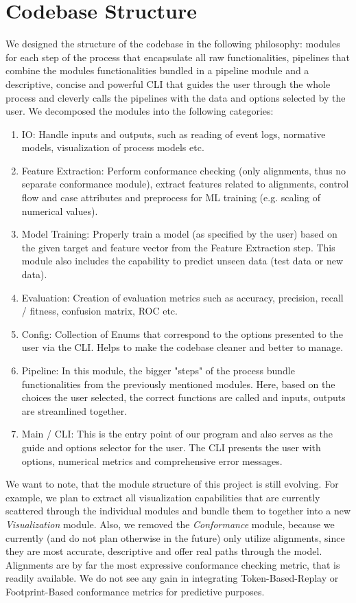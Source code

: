 \documentclass[12pt,a4paper]{article}
\begin{document}
\section{Codebase Structure}
We designed the structure of the codebase in the following philosophy: modules for each step of the process that encapsulate all raw functionalities, pipelines that combine the modules functionalities bundled in a pipeline module and a descriptive, concise and powerful CLI that guides the user through the whole process and cleverly calls the pipelines with the data and options selected by the user.  
We decomposed the modules into the following categories: 
\begin{enumerate}
	\item IO: Handle inputs and outputs, such as reading of event logs, normative models, visualization of process models etc.
	\item Feature Extraction: Perform conformance checking (only alignments, thus no separate conformance module), extract features related to alignments, control flow and case attributes and preprocess for ML training (e.g. scaling of numerical values).
	\item Model Training: Properly train a model (as specified by the user) based on the given target and feature vector from the Feature Extraction step. This module also includes the capability to predict unseen data (test data or new data).
	\item Evaluation: Creation of evaluation metrics such as accuracy, precision, recall / fitness, confusion matrix, ROC etc.
	\item Config: Collection of Enums that correspond to the options presented to the user via the CLI. Helps to make the codebase cleaner and better to manage.
	\item Pipeline: In this module, the bigger "steps" of the process bundle functionalities from the previously mentioned modules. Here, based on the choices the user selected, the correct functions are called and inputs, outputs are streamlined together.
	\item Main / CLI: This is the entry point of our program and also serves as the guide and options selector for the user. The CLI presents the user with options, numerical metrics and comprehensive error messages.
\end{enumerate}
We want to note, that the module structure of this project is still evolving. For example, we plan to extract all visualization capabilities that are currently scattered through the individual modules and bundle them to together into a new \textit{Visualization} module.
Also, we removed the \textit{Conformance} module, because we currently (and do not plan otherwise in the future) only utilize alignments, since they are most accurate, descriptive and offer real paths through the model. Alignments are by far the most expressive conformance checking metric, that is readily available. We do not see any gain in integrating Token-Based-Replay or Footprint-Based conformance metrics for predictive purposes.
\end{document}
